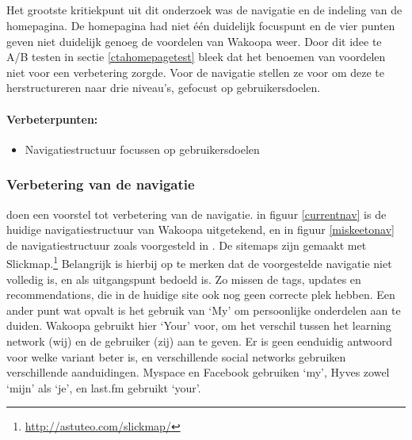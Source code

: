 \documentclass[a4paper, 10pt, pdftex]{report}
\begin{document}
    \subsection{\cite{Hoekman2008}}
    Het grootste kritiekpunt uit dit onderzoek was de navigatie en de indeling van de homepagina. De homepagina had niet \'e\'en duidelijk focuspunt en de vier punten geven niet duidelijk genoeg de voordelen van Wakoopa weer. Door dit idee te A/B testen in sectie \ref{ctahomepagetest} bleek dat het benoemen van voordelen niet voor een verbetering zorgde. Voor de navigatie stellen ze voor om deze te herstructureren naar drie niveau's, gefocust op gebruikersdoelen.

    \paragraph{\textbf{Verbeterpunten:}}
      \begin{itemize}
        \item Navigatiestructuur focussen op gebruikersdoelen
      \end{itemize}

    \subsubsection{Verbetering van de navigatie}
      \citeauthor{Hoekman2008} doen een voorstel tot verbetering van de navigatie. in figuur \ref{currentnav} is de huidige navigatiestructuur van Wakoopa uitgetekend, en in figuur \ref{miskeetonav} de navigatiestructuur zoals voorgesteld in  \cite{Hoekman2008}. De sitemaps zijn gemaakt met Slickmap.\footnote{\url{http://astuteo.com/slickmap/}} Belangrijk is hierbij op te merken dat de voorgestelde navigatie niet volledig is, en als uitgangspunt bedoeld is. Zo missen de tags, updates en recommendations, die in de huidige site ook nog geen correcte plek hebben. Een ander punt wat opvalt is het gebruik van `My' om persoonlijke onderdelen aan te duiden. Wakoopa gebruikt hier `Your' voor, om het verschil tussen het learning network (wij) en de gebruiker (zij) aan te geven. Er is geen eenduidig antwoord voor welke variant beter is, en verschillende social networks gebruiken verschillende aanduidingen. Myspace en Facebook gebruiken `my', Hyves zowel `mijn' als `je', en last.fm gebruikt `your'.
\end{document}
